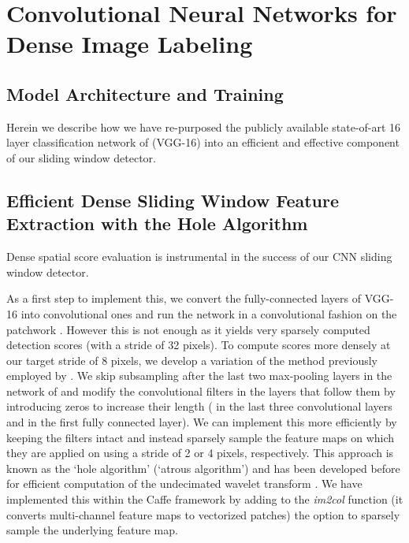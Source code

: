 \section{Convolutional Neural Networks for Dense Image Labeling}
\label{sec:convnets}

\subsection{Model Architecture and Training}
\label{sec:convnet-arch}

Herein we describe how we have re-purposed the publicly available state-of-art
16 layer classification network of \cite{simonyan2014very} (VGG-16) into an efficient
and effective component of our sliding window detector.

\subsection{Efficient Dense Sliding Window Feature Extraction with the Hole Algorithm}
\label{sec:convnet-hole}

Dense spatial score evaluation is instrumental in the success of our CNN
sliding window detector. 

As a first step to implement this, we convert the fully-connected layers
of VGG-16 into convolutional ones and run the network in a convolutional
fashion on the patchwork \citep{dubout2012exact}. However this is not enough as it yields very
sparsely computed detection scores (with a stride of 32 pixels). To compute
scores more densely at our target stride of 8 pixels, we develop a variation
of the method previously employed by \cite{GCMG+13, sermanet2013overfeat}. We skip
subsampling after the last two max-pooling layers in the network of
\cite{simonyan2014very} and modify the convolutional filters in the layers that follow
them by introducing zeros to increase their length ( in the last three
convolutional layers and  in the first fully connected layer). We can
implement this more efficiently by keeping the filters intact and instead
sparsely sample the feature maps on which they are applied on using a stride
of 2 or 4 pixels, respectively. This approach is known as the `hole algorithm'
(`atrous algorithm') and has been developed before for efficient computation
of the undecimated wavelet transform \cite{Mall99}. We have implemented this
within the Caffe framework \citep{jia2014caffe} by adding to the \textsl{im2col} function (it
converts multi-channel feature maps to vectorized patches) the option to
sparsely sample the underlying feature map.

